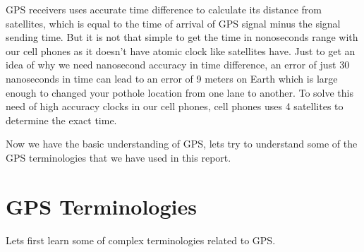 \documentclass[12pt]{report}
\begin{document}
GPS receivers uses accurate time difference to calculate it\textquotesingle s
distance from satellites, which is equal to the time of arrival of GPS signal
minus the signal sending time. But it is not that simple to get the time in
nonoseconds range with our cell phones as it doesn't have atomic clock like
satellites have. Just to get an idea of why we need nanosecond accuracy in time
difference, an error of just 30 nanoseconds in time can lead to an error of 9
meters on Earth which is large enough to changed your pothole location from one
lane to another. To solve this need of high accuracy clocks in our cell phones,
cell phones uses 4 satellites to determine the exact time.

Now we have the basic understanding of GPS, lets try to understand some of the
GPS terminologies that we have used in this report.









\section{GPS Terminologies}
Lets first learn some of complex terminologies related to GPS.
\end{document}
